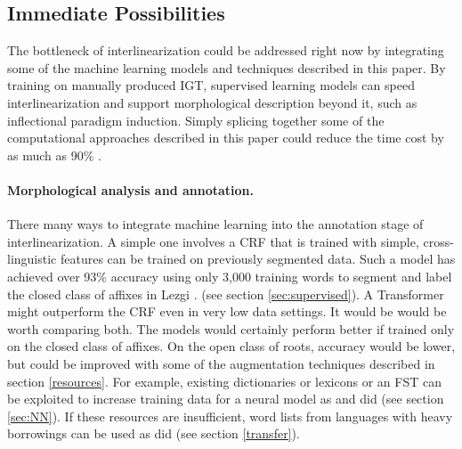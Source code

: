 \documentclass[12pt]{article}
\begin{document}
\subsection{Immediate Possibilities}
\label{sec:splicing}

The bottleneck of interlinearization could be addressed right now by integrating some of the machine learning models and techniques described in this paper. By training on manually produced IGT, supervised learning models can speed interlinearization and support morphological description beyond it, such as inflectional paradigm induction. Simply splicing together some of the computational approaches described in this paper could reduce the time cost by as much as 90\% \cite{felt_improving_2012,moeller_automatic_2018}.  

\paragraph{Morphological analysis and annotation.} There many ways to integrate machine learning into the annotation stage of interlinearization. A simple one involves a CRF that is trained with simple, cross-linguistic features can be trained on previously segmented data. Such a model has achieved over 93\% accuracy using only 3,000 training words to segment and label the closed class of affixes in Lezgi \cite{moeller_automatic_2018}. (see section \ref{sec:supervised}). A Transformer might outperform the CRF even in very low data settings. It would be would be worth comparing both. The models would certainly perform better if trained only on the closed class of affixes. On the open class of roots, accuracy would be lower, but could be improved with some of the augmentation techniques described in section \ref{resources}. For example, existing dictionaries or lexicons or an FST can be exploited to increase training data for a neural model as 
 and  did (see section \ref{sec:NN}). If these resources are insufficient, word lists from languages with heavy borrowings can be used as  did (see section \ref{transfer}). 
\end{document}
